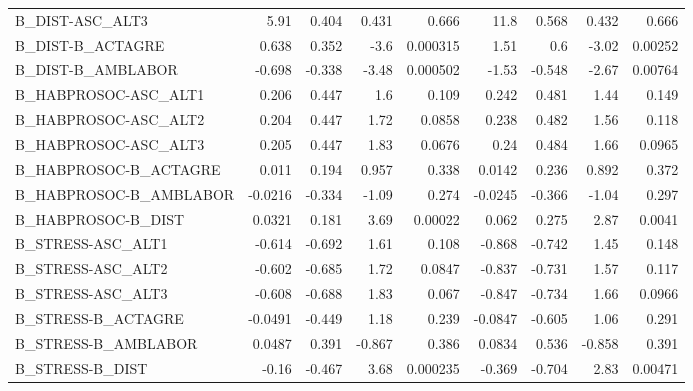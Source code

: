 \begin{tabular}{lrrrrrrrr}
B\_DIST-ASC\_ALT3               &        5.91 &        0.404 &   0.431 &    0.666 &       11.8 &       0.568 &        0.432 &         0.666 \\
B\_DIST-B\_ACTAGRE              &       0.638 &        0.352 &    -3.6 & 0.000315 &       1.51 &         0.6 &        -3.02 &       0.00252 \\
B\_DIST-B\_AMBLABOR             &      -0.698 &       -0.338 &   -3.48 & 0.000502 &      -1.53 &      -0.548 &        -2.67 &       0.00764 \\
B\_HABPROSOC-ASC\_ALT1          &       0.206 &        0.447 &     1.6 &    0.109 &      0.242 &       0.481 &         1.44 &         0.149 \\
B\_HABPROSOC-ASC\_ALT2          &       0.204 &        0.447 &    1.72 &   0.0858 &      0.238 &       0.482 &         1.56 &         0.118 \\
B\_HABPROSOC-ASC\_ALT3          &       0.205 &        0.447 &    1.83 &   0.0676 &       0.24 &       0.484 &         1.66 &        0.0965 \\
B\_HABPROSOC-B\_ACTAGRE         &       0.011 &        0.194 &   0.957 &    0.338 &     0.0142 &       0.236 &        0.892 &         0.372 \\
B\_HABPROSOC-B\_AMBLABOR        &     -0.0216 &       -0.334 &   -1.09 &    0.274 &    -0.0245 &      -0.366 &        -1.04 &         0.297 \\
B\_HABPROSOC-B\_DIST            &      0.0321 &        0.181 &    3.69 &  0.00022 &      0.062 &       0.275 &         2.87 &        0.0041 \\
B\_STRESS-ASC\_ALT1             &      -0.614 &       -0.692 &    1.61 &    0.108 &     -0.868 &      -0.742 &         1.45 &         0.148 \\
B\_STRESS-ASC\_ALT2             &      -0.602 &       -0.685 &    1.72 &   0.0847 &     -0.837 &      -0.731 &         1.57 &         0.117 \\
B\_STRESS-ASC\_ALT3             &      -0.608 &       -0.688 &    1.83 &    0.067 &     -0.847 &      -0.734 &         1.66 &        0.0966 \\
B\_STRESS-B\_ACTAGRE            &     -0.0491 &       -0.449 &    1.18 &    0.239 &    -0.0847 &      -0.605 &         1.06 &         0.291 \\
B\_STRESS-B\_AMBLABOR           &      0.0487 &        0.391 &  -0.867 &    0.386 &     0.0834 &       0.536 &       -0.858 &         0.391 \\
B\_STRESS-B\_DIST               &       -0.16 &       -0.467 &    3.68 & 0.000235 &     -0.369 &      -0.704 &         2.83 &       0.00471 \\

\end{tabular}
